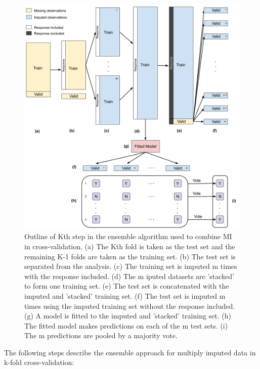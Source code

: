 \documentclass[12pt,]{article}
\begin{document}
\begin{figure}[H]

{\centering \includegraphics[width=1\linewidth]{images/ensemble-imputation} 

}

\caption{\label{fig:ensemble-imputation}Outline of Kth step in the ensemble algorithm used to combine MI in cross-validation.  (a) The Kth fold is taken as the test set and the remaining K-1 folds are taken as the training set. (b) The test set is separated from the analysis. (c) The training set is imputed m times with the response included. (d) The m iputed datasets are 'stacked' to form one training set.  (e) The test set is concatenated with the imputed and 'stacked' training set.  (f) The test set is imputed m times using the imputed training set without the response included.  (g) A model is fitted to the imputed and 'stacked' training set.  (h) The fitted model makes predictions on each of the m test sets.  (i) The m predictions are pooled by a majority vote.}\label{fig:unnamed-chunk-2}
\end{figure}

The following steps describe the ensemble approach for multiply imputed
data in k-fold cross-validation:
\end{document}
